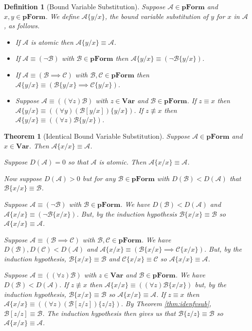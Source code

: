 \documentclass[12pt]{article}
\theoremstyle{break}
\newtheorem{definition}{Definition}[section]
\theoremstyle{break}
\newtheorem{theorem}{Theorem}[section]
\theoremstyle{break}
\theoremstyle{break}
\theoremstyle{break}
\newtheorem{informal definition}[definition]{Informal Definition}
\newcommand{\mc}[1]{\mathcal{#1}}
\begin{document}
\begin{definition}[Bound Variable Substitution]
Suppose $\mc{A}\in\textbf{pForm}$ and $x, y \in \textbf{pForm}$.
We define $\mc{A}\{y/x\}$, the bound variable substitution of $y$ for $x$ in $\mc{A}$, as follows.

\begin{itemize}
\item{If $\mc{A}$ is atomic then $\mc{A}\{y/x\} \equiv \mc{A}$.}
\item{If $\mc{A} \equiv (\lnot \mc{B})$ with $\mc{B}\in\textbf{pForm}$ then $\mc{A}\{y/x\} \equiv (\lnot \mc{B}\{y/x\})$.}
\item{If $\mc{A}\equiv (\mc{B}\implies\mc{C})$ with $\mc{B}, \mc{C} \in \textbf{pForm}$ then $\mc{A}\{y/x\} \equiv (\mc{B}\{y/x\} \implies \mc{C}\{y/x\})$.}
\item{Suppose $\mc{A} \equiv ((\forall z) \mc{B})$ with $z\in\textbf{Var}$ and $\mc{B}\in\textbf{pForm}$. If $z \equiv x$ then $\mc{A}\{y/x\} \equiv ((\forall y) (\mc{B}[y/x])\{y/x\})$. If $z\not \equiv x$ then $\mc{A}\{y/x\} \equiv ((\forall z)\mc{B}\{y/x\})$.}
\end{itemize}
\end{definition}

\begin{theorem}[Identical Bound Variable Substitution]
\label{thm:identqvsub}
Suppose $\mc{A}\in\textbf{pForm}$ and $x\in\textbf{Var}$.
Then $\mc{A}\{x/x\} \equiv \mc{A}$.

Suppose $D(\mc{A}) = 0$ so that $\mc{A}$ is atomic.
Then $\mc{A}\{x/x\} \equiv \mc{A}$.

Now suppose $D(\mc{A}) > 0$ but for any $\mc{B}\in\textbf{pForm}$ with $D(\mc{B}) < D(\mc{A})$ that $\mc{B}\{x/x\} \equiv \mc{B}$.

Suppose $\mc{A}\equiv (\lnot \mc{B})$ with $\mc{B}\in\textbf{pForm}$.
We have $D(\mc{B}) < D(\mc{A})$ and $\mc{A}\{x/x\} \equiv (\lnot \mc{B}\{x/x\})$.
But, by the induction hypothesis $\mc{B}\{x/x\} \equiv \mc{B}$ so $\mc{A}\{x/x\} \equiv \mc{A}$.

Suppose $\mc{A}\equiv (\mc{B}\implies \mc{C})$ with $\mc{B}, \mc{C}\in\textbf{pForm}$.
We have $D(\mc{B}), D(\mc{C}) < D(\mc{A})$ and $\mc{A}\{x/x\} \equiv (\mc{B}\{x/x\}\implies \mc{C}\{x/x\})$.
But, by the induction hypothesis, $\mc{B}\{x/x\}\equiv \mc{B}$ and $\mc{C}\{x/x\} \equiv \mc{C}$ so $\mc{A}\{x/x\} \equiv \mc{A}$.

Suppose $\mc{A} \equiv ((\forall z)\mc{B})$ with $z\in\textbf{Var}$ and $\mc{B}\in\textbf{pForm}$.
We have $D(\mc{B}) < D(\mc{A})$.
If $z\not \equiv x$ then $\mc{A}\{x/x\} \equiv ((\forall z)\mc{B}\{x/x\})$ but, by the induction hypothesis, $\mc{B}\{x/x\} \equiv \mc{B}$ so $\mc{A}\{x/x\} \equiv \mc{A}$.
If $z \equiv x$ then $\mc{A}\{x/x\} \equiv ((\forall z)(\mc{B}[z/z])\{z/z\})$.
By Theorem \ref{thm:idenfvsub}, $\mc{B}[z/z] \equiv \mc{B}$.
The induction hypothesis then gives us that $\mc{B}\{z/z\} \equiv \mc{B}$ so $\mc{A}\{x/x\} \equiv \mc{A}$.
\end{theorem}
\end{document}
